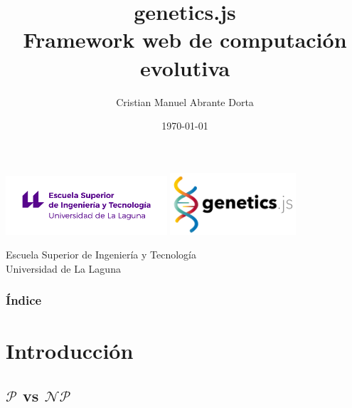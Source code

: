 \documentclass{beamer}
\title[genetics.js]{
    genetics.js \\
    Framework web de computación evolutiva
}
\author[Cristian Abrante]{Cristian Manuel Abrante Dorta}
\institute[ULL]{Universidad de La Laguna}
\date[21-06-2019]{\today}
\begin{document}
  
\begin{frame}

  \includegraphics[width=0.45\textwidth]{pres/img/etsit-logo.png}
  \hspace*{2cm}
  \includegraphics[width=0.35\textwidth]{pres/img/geneticsjs-logo.png}
  \titlepage

  \begin{scriptsize}
    \begin{center}
     Escuela Superior de Ingeniería y Tecnología \\
     Universidad de La Laguna
    \end{center}
  \end{scriptsize}

\end{frame}

\begin{frame}
  \frametitle{Índice}  
  \tableofcontents
\end{frame}

\section{Introducción}


\subsection{$\mathcal{P}$ vs $\mathcal{NP}$}
\end{document}
